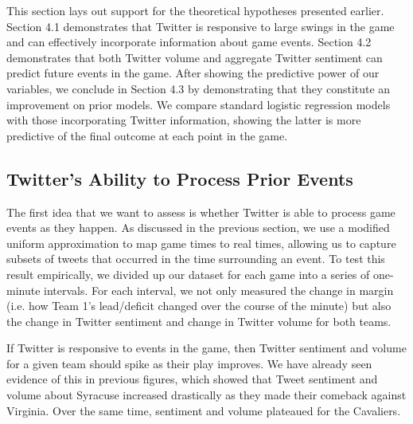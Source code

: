 \documentclass[12pt]{article}
\begin{document}
\begin{doublespacing}
This section lays out support for the theoretical hypotheses presented earlier. Section 4.1 demonstrates that Twitter is responsive to large swings in the game and can effectively incorporate information about game events. Section 4.2 demonstrates that both Twitter volume and aggregate Twitter sentiment can predict future events in the game. After showing the predictive power of our variables, we conclude in Section 4.3 by demonstrating that they constitute an improvement on prior models. We compare standard logistic regression models with those incorporating Twitter information, showing the latter is more predictive of the final outcome at each point in the game. 

\subsection{Twitter's Ability to Process Prior Events}

The first idea that we want to assess is whether Twitter is able to process game events as they happen. As discussed in the previous section, we use a modified uniform approximation to map game times to real times, allowing us to capture subsets of tweets that occurred in the time surrounding an event. To  test this result empirically, we divided up our dataset for each game into a series of one-minute intervals. For each interval, we not only measured the change in margin (i.e. how Team 1's lead/deficit changed over the course of the minute) but also the change in Twitter sentiment and change in Twitter volume for both teams. 

If Twitter is responsive to events in the game, then Twitter sentiment and volume for a given team should spike as their play improves. We have already seen evidence of this in previous figures, which showed that Tweet sentiment and volume about Syracuse increased drastically as they made their comeback against Virginia. Over the same time, sentiment and volume plateaued for the Cavaliers. 


\end{doublespacing}
\end{document}
